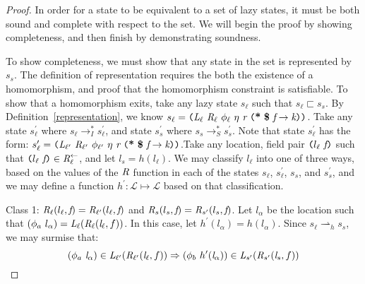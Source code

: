 \begin{proof}
In order for a state to be equivalent to a set of lazy states, it must be both sound and complete with respect to the set. We will begin the proof by showing completeness, and then finish by demonstrating soundness.

To show completeness, we must show that any state in the set is represented by $s_s$. The definition of representation requires the both the existence of a homomorphism, and proof that the homomorphism constraint is satisfiable. To show that a homomorphism exits, take any lazy state $s_\ell$ such that $s_\ell \sqsubset s_s$. By Definition~\ref{representation}, we know $s_\ell = \lp \cfgnt{L}_\ell\ \cfgnt{R}_\ell\ \phi_\ell\ \eta\ \cfgnt{r}\ \lp \cfgt{*}\ \cfgt{\$}\ \cfgnt{f} \rightarrow \cfgnt{k}\rp \rp$. Take any state $s_\ell^\prime$ where $s_\ell \rightarrow_I^* s_\ell^\prime$, and state $s_s^\prime$ where $s_s \rightarrow_S^* s_s^\prime$. Note that  state $s_\ell^\prime$ has the form: $s_\ell^\prime = \lp \cfgnt{L}_{\ell^\prime}\ \cfgnt{R}_{\ell^\prime}\ \phi_{\ell^\prime}\ \eta\ \cfgnt{r}\ \lp \cfgt{*}\ \cfgt{\$}\ \cfgnt{f} \rightarrow \cfgnt{k}\rp \rp$.Take any location, field pair $\texttt{(} l_\ell\  \emph{f}\texttt{)}$ such that $\texttt{(} l_\ell\  \emph{f}\texttt{)} \in \emph{R}_{\ell}^\leftarrow$, and let $l_s = h(l_\ell)$. We may classify $l_\ell$ into one of three ways, based on the values of the $\emph{R}$ function in each of the states $s_\ell$, $s_\ell^\prime$, $s_s$, and $s_s^\prime$, and we may define a function $h^\prime: \mathcal{L} \mapsto \mathcal{L}$ based on that classification.

Class 1: $\emph{R}_\ell ( l_\ell,  \emph{f} ) = \emph{R}_{\ell^\prime} ( l_\ell,  \emph{f} )$ and $\emph{R}_{s} ( l_s,  \emph{f} ) = \emph{R}_{s^\prime} ( l_s,  \emph{f})$.  Let $l_\alpha$ be the location such that ${(\phi_a\ l_\alpha)} = \cfgnt{L}_{\ell}(\cfgnt{R}_{\ell} (\cfgnt{l}_\ell,f )) $. In this case, let $h^\prime(l_\alpha) = h(l_\alpha)$. Since $s_\ell \rightharpoonup_h s_s$, we may surmise that: 
$$(\phi_a\ \cfgnt{l}_\alpha) \in \cfgnt{L}_{\ell^\prime}(\cfgnt{R}_{\ell^\prime} (\cfgnt{l}_\ell,f )) \Rightarrow (\phi_b\ h^\prime (\cfgnt{l}_\alpha))\in \cfgnt{L}_{s^\prime}(\cfgnt{R}_{s^\prime} (\cfgnt{l}_s,f ))$$


\end{proof}
